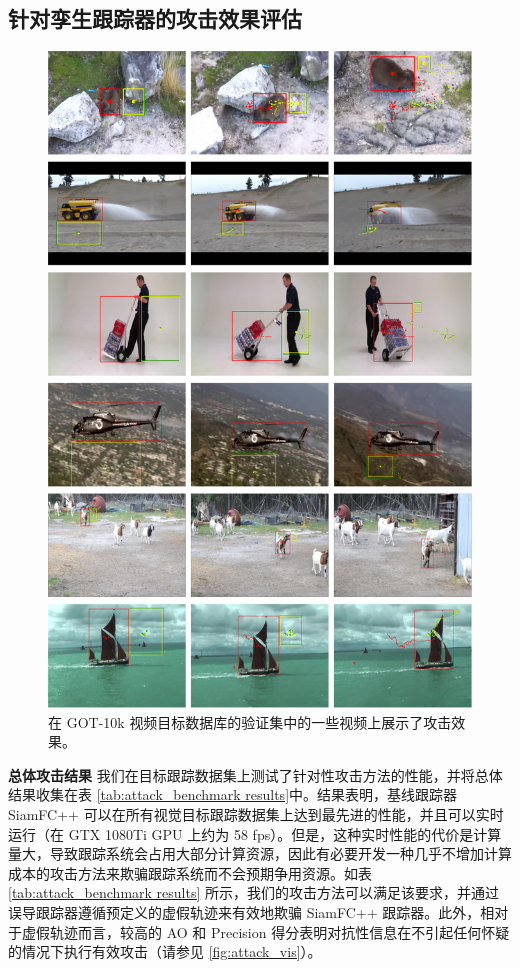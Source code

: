 \subsection{针对孪生跟踪器的攻击效果评估}
\begin{figure}[p]
\centering
\includegraphics[width=1.0\textwidth]{Img/attack/txt_visualize.pdf}
\caption{在 GOT-10k \cite{GOT-10k} 视频目标数据库的验证集中的一些视频上展示了攻击效果。}
\end{figure}

\textbf{总体攻击结果} 我们在目标跟踪数据集上测试了针对性攻击方法的性能，并将总体结果收集在表 \ref{tab:attack_benchmark results}中。结果表明，基线跟踪器 SiamFC++ 可以在所有视觉目标跟踪数据集上达到最先进的性能，并且可以实时运行（在 GTX 1080Ti GPU 上约为 58 fps）。但是，这种实时性能的代价是计算量大，导致跟踪系统会占用大部分计算资源，因此有必要开发一种几乎不增加计算成本的攻击方法来欺骗跟踪系统而不会预期争用资源。如表 \ref{tab:attack_benchmark results} 所示，我们的攻击方法可以满足该要求，并通过误导跟踪器遵循预定义的虚假轨迹来有效地欺骗 SiamFC++ 跟踪器。此外，相对于虚假轨迹而言，较高的 AO 和 Precision 得分表明对抗性信息在不引起任何怀疑的情况下执行有效攻击（请参见 \ref{fig:attack_vis}）。

